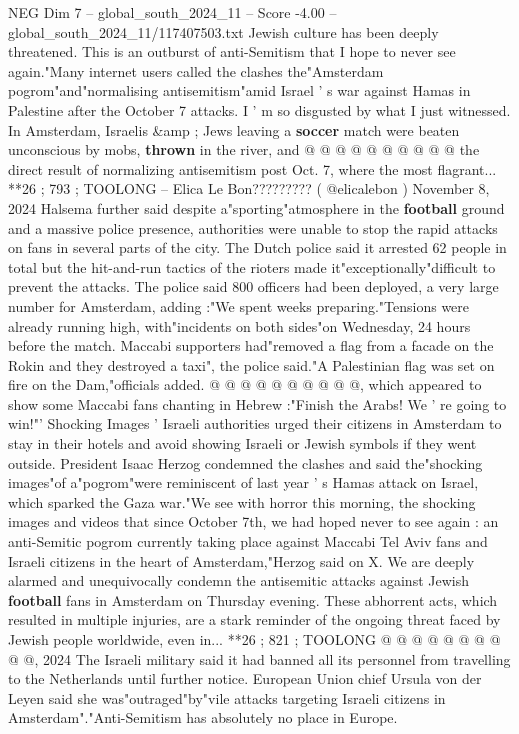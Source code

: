 \begin{textsample}{NEG Dim 7 – global\_south\_2024\_11 – Score -4.00 – global\_south\_2024\_11/117407503.txt}
Jewish culture has been deeply threatened.
This is an outburst of anti-Semitism that I hope to never see again."Many internet users called the clashes the"Amsterdam pogrom"and"normalising antisemitism"amid Israel ' s war against Hamas in Palestine after the October 7 attacks.
I ' m so disgusted by what I just witnessed.
In Amsterdam, Israelis \&amp ; Jews leaving a \textbf{soccer} match were beaten unconscious by mobs, \textbf{thrown} in the river, and @ @ @ @ @ @ @ @ @ @ the direct result of normalizing antisemitism post Oct. 7, where the most flagrant... **26 ; 793 ; TOOLONG -- Elica Le Bon????????? ( @elicalebon ) November 8, 2024 Halsema further said despite a"sporting"atmosphere in the \textbf{football} ground and a massive police presence, authorities were unable to stop the rapid attacks on fans in several parts of the city.
The Dutch police said it arrested 62 people in total but the hit-and-run tactics of the rioters made it"exceptionally"difficult to prevent the attacks.
The police said 800 officers had been deployed, a very large number for Amsterdam, adding :"We spent weeks preparing."Tensions were already running high, with"incidents on both sides"on Wednesday, 24 hours before the match.
Maccabi supporters had"removed a flag from a facade on the Rokin and they destroyed a taxi", the police said."A Palestinian flag was set on fire on the Dam,"officials added. @ @ @ @ @ @ @ @ @ @, which appeared to show some Maccabi fans chanting in Hebrew :"Finish the Arabs!
We ' re going to win!"' Shocking Images ' Israeli authorities urged their citizens in Amsterdam to stay in their hotels and avoid showing Israeli or Jewish symbols if they went outside.
President Isaac Herzog condemned the clashes and said the"shocking images"of a"pogrom"were reminiscent of last year ' s Hamas attack on Israel, which sparked the Gaza war."We see with horror this morning, the shocking images and videos that since October 7th, we had hoped never to see again : an anti-Semitic pogrom currently taking place against Maccabi Tel Aviv fans and Israeli citizens in the heart of Amsterdam,"Herzog said on X.
We are deeply alarmed and unequivocally condemn the antisemitic attacks against Jewish \textbf{football} fans in Amsterdam on Thursday evening.
These abhorrent acts, which resulted in multiple injuries, are a stark reminder of the ongoing threat faced by Jewish people worldwide, even in... **26 ; 821 ; TOOLONG @ @ @ @ @ @ @ @ @ @, 2024 The Israeli military said it had banned all its personnel from travelling to the Netherlands until further notice.
European Union chief Ursula von der Leyen said she was"outraged"by"vile attacks targeting Israeli citizens in Amsterdam"."Anti-Semitism has absolutely no place in Europe.

\end{textsample}
